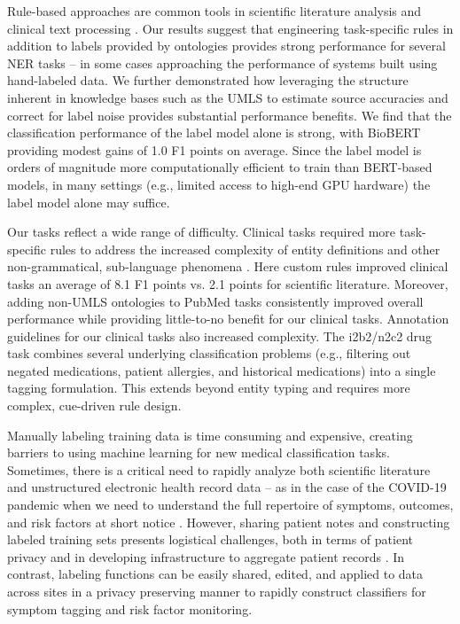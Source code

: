 \documentclass{article}
\begin{document}
Rule-based approaches are common tools in scientific literature analysis and clinical text processing \cite{Fu2020-hh}. 
Our results suggest that engineering task-specific rules in addition to labels provided by ontologies provides strong performance for several NER tasks -- in some cases approaching the performance of systems built using hand-labeled data. 
We further demonstrated how leveraging the structure inherent in knowledge bases such as the UMLS to estimate source accuracies and correct for label noise provides substantial performance benefits. 
We find that the classification performance of the label model alone is strong, with BioBERT providing modest gains of {1.0} F1 points on average. 
Since the label model is orders of magnitude more computationally efficient to train than BERT-based models, in many settings (e.g., limited access to high-end GPU hardware) the label model alone may suffice.

Our tasks reflect a wide range of difficulty. 
Clinical tasks required more task-specific rules to address the increased complexity of entity definitions and other non-grammatical, sub-language phenomena \cite{Friedman2002-gs}. 
Here custom rules improved clinical tasks an average of {8.1} F1 points vs. {2.1} points for scientific literature. 
Moreover, adding non-UMLS ontologies to PubMed tasks consistently improved overall performance while providing little-to-no benefit for our clinical tasks. 
Annotation guidelines for our clinical tasks also increased complexity. 
The i2b2/n2c2 drug task combines several underlying classification problems (e.g., filtering out negated medications, patient allergies, and historical medications) into a single tagging formulation. This extends beyond entity typing and requires more complex, cue-driven rule design. 

Manually labeling training data is time consuming and expensive, creating barriers to using machine learning for new medical classification tasks. 
Sometimes, there is a critical need to rapidly analyze both scientific literature and unstructured electronic health record data -- as in the case of the COVID-19 pandemic when we need to understand the full repertoire of symptoms, outcomes, and risk factors at short notice \cite{Callahan2020-gf,Shweta2020-wg,Wang2020-dp}. 
However, sharing patient notes and constructing labeled training sets presents logistical challenges, both in terms of patient privacy and in developing infrastructure to aggregate patient records \cite{noauthor_2020-ea}. 
In contrast, labeling functions can be easily shared, edited, and applied to data across sites in a privacy preserving manner to rapidly construct classifiers for symptom tagging and risk factor monitoring. 
\end{document}

